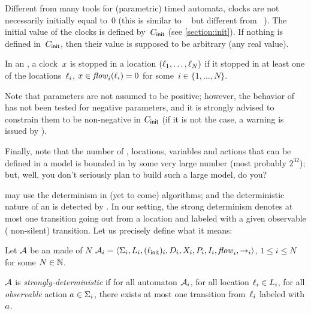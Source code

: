Different from many tools for (parametric) timed automata, clocks are not necessarily initially equal to~0 (this is similar to \hytech{}~\cite{HHW95} but different from \uppaal{}~\cite{LPY97}).
The initial value of the clocks is defined by~$C_{\textsf{init}}$ (see \cref{section:init}).
If nothing is defined in~$C_{\textsf{init}}$, then their value is supposed to be arbitrary (any real value).


In an \NIPTA{}, a clock~$x$ is stopped in a location $(\ell_1, \dots, \ell_N)$ if it stopped in at least one of the locations~$\ell_i$, \ie{} $x \in \mathit{flow}_i(\ell_i) = 0$ for some~$i \in \{ 1 , \dots , N \}$.

Note that parameters are not assumed to be positive; however, the behavior of \imitator{} has not been tested for negative parameters, and it is strongly advised to constrain them to be non-negative in $C_{\textsf{init}}$ (if it is not the case, a warning is issued by \imitator{}).


Finally, note that the number of \IPTA{}, locations, variables and actions that can be defined in a model is bounded in \imitator{} by some very large number (most probably $2^{32}$); but, well, you don't seriously plan to build such a large model, do you?

\bigskip

\imitator{} may use the determinism in (yet to come) algorithms; and the deterministic nature of an \NIPTA{} is detected by \imitator{}.
In our setting, the strong determinism denotes at most one transition going out from a location and labeled with a given observable (\ie{} non-silent) transition.
Let us precisely define what it means:

\begin{definition}
	Let $\mathcal{A}$ be an \NIPTA{} made of $N$ \IPTA{} $\mathcal{A}_i = \langle\Sigma_i, L_i, (\ell_{\textsf{init}})_i, D_i, X_i, P_i, I_i, \mathit{flow}_i, {\rightarrow}_i\rangle$, $1 \leq i \leq N$ for some $N \in \mathbb N$.

	$\mathcal{A}$ is \emph{strongly-deterministic} if
	for all automaton $\mathcal{A}_i$,
	for all location $\ell_i \in L_i$,
	for all \emph{observable} action $a \in \Sigma_i$,
	there exists at most one transition from~$\ell_i$ labeled with $a$.
\end{definition}




